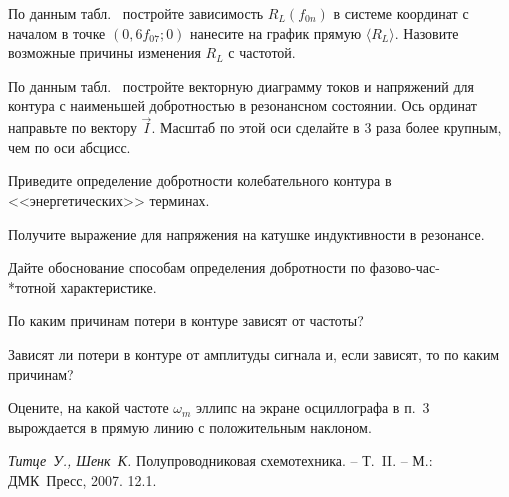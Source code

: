 \begin{lab:task}
\item По данным табл.~ постройте зависимость $R_L(f_{0n})$ в
системе координат с началом в точке $(0,6f_{07};0)$ нанесите на график прямую
$\langle R_L \rangle.$ Назовите возможные причины изменения $R_L$ с частотой.

\item По данным табл.~ постройте векторную диаграмму токов и
напряжений для контура с наименьшей добротностью в резонансном состоянии. Ось
ординат направьте по вектору $\vec I.$ Масштаб по этой оси 
сделайте в 3 раза более крупным, чем по оси абсцисс.
\end{lab:task}


\begin{lab:questions}
    \item   Приведите определение добротности колебательного контура в
<<энергетических>> терминах.

    \item  Получите выражение для напряжения на катушке индуктивности  в
резонансе.

    \item Дайте обоснование способам определения добротности по
фазово-час-\\*тотной характеристике.

    \item По каким причинам потери в контуре зависят от частоты?

    \item * Зависят ли потери в контуре от амплитуды сигнала и, если зависят, то
по каким причинам?

    \item * Оцените, на какой частоте $\omega_m$ эллипс на экране осциллографа в
п.~3 вырождается в прямую линию с положительным наклоном.
\end{lab:questions}


\begin{lab:literature}
    \item \emph{Титце~У., Шенк~К.} Полупроводниковая схемотехника.  – Т.~II. –
М.: ДМК~Пресс, 2007. 12.1.
\end{lab:literature}

